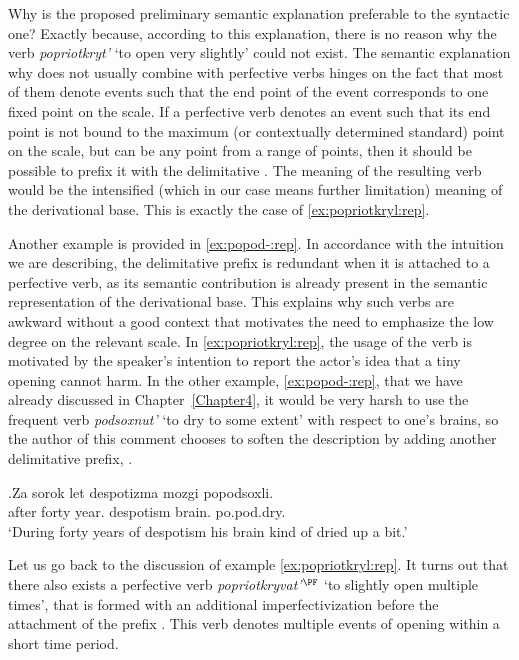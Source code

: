 Why is the proposed preliminary semantic explanation preferable to the syntactic one? Exactly because, according to this explanation, there is no reason why the verb \textit{popriotkryt'} `to open very slightly' could not exist. The semantic explanation why  does not usually combine with perfective verbs hinges on the fact that most of them denote events such that the end point of the event corresponds to one fixed point on the scale. If a perfective verb denotes an event such that its end point is not bound to the maximum (or contextually determined standard) point on the scale, but can be any point from a range of points, then it should be possible to prefix it with the delimitative . The meaning of the resulting verb would be the intensified (which in our case means further limitation) meaning of the derivational base. This is exactly the case of \ref{ex:popriotkryl:rep}.

Another example is provided in \ref{ex:popod-:rep}. In accordance with the intuition we are describing, the delimitative prefix  is redundant when it is attached to a perfective verb, as its semantic contribution is already present in the semantic representation of the derivational base. This explains why such verbs are awkward without a good context that motivates the need to emphasize the low degree on the relevant scale. In \ref{ex:popriotkryl:rep}, the usage of the verb is motivated by the speaker's intention to report the actor's idea that a tiny opening cannot harm. In the other example, \ref{ex:popod-:rep}, that we have already discussed in Chapter~\ref{Chapter4}, it would be very harsh to use the frequent verb \textit{podsoxnut'} `to dry to some extent' with respect to one's brains, so the author of this comment chooses to soften the description by adding another delimitative prefix, . 

\exg.\label{ex:popod-:rep}Za sorok let despotizma mozgi popodsoxli.\\
after forty year. despotism brain. po.pod.dry.\\
\trans `During forty years of despotism his brain kind of dried up a bit.'\\

Let us go back to the discussion of example \ref{ex:popriotkryl:rep}. It turns out that there also exists a perfective verb \textit{popriotkryvat'}$^{\PF}$ `to slightly open multiple times', that is formed with an additional imperfectivization before the attachment of the prefix . This verb denotes multiple events of opening within a short time period. 

